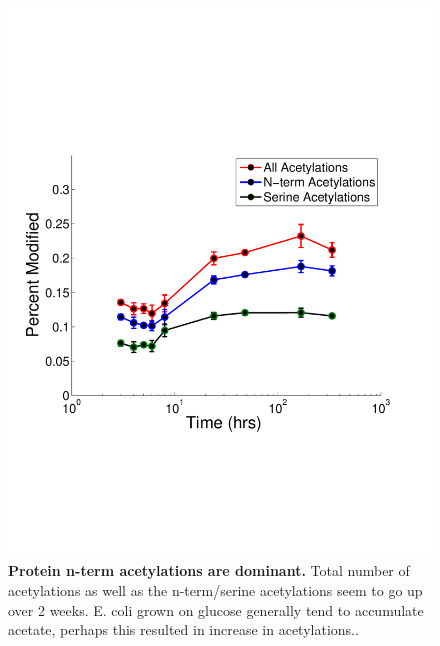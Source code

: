 \documentclass[12pt]{article}
\begin{document}
\clearpage
\begin{figure}[p]
\centerline{\includegraphics[width=5in]{Figures/Acetylation_AAs.pdf}}
\caption{\label{fig:Acet}\textbf{Protein n-term acetylations are dominant.} Total number of acetylations as well as the n-term/serine acetylations seem to go up over 2 weeks. E. coli grown on glucose generally tend to accumulate acetate, perhaps this resulted in increase in acetylations..}
\end{figure}
\end{document}
